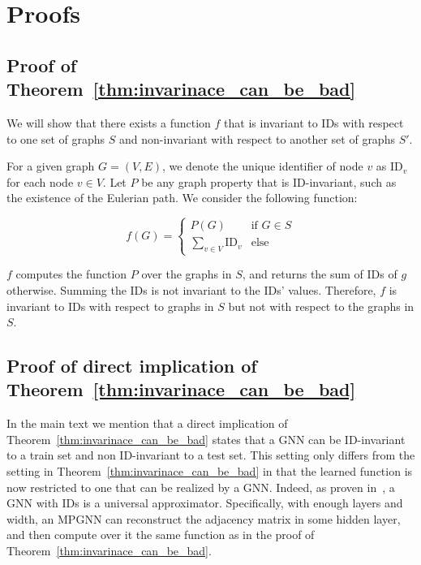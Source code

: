 \onecolumn

\section{Proofs}
\subsection{Proof of Theorem~\ref{thm:invarinace_can_be_bad}}
We will show that there exists a function $f$  that is invariant to IDs with respect to one set of graphs \( S \) and non-invariant with respect to another set of graphs \( S' \). 

For a given graph $G=(V,E)$, we denote the unique identifier of node $v$ as \( \text{ID}_v \) for each node \( v \in V \). Let $P$ be any graph property that is ID-invariant, such as the existence of the Eulerian path. We consider the following function:

   \[
   f(G) = 
   \begin{cases} 
   P(G) & \text{if } G \in S \\ 
   \sum_{v \in V} \text{ID}_v & \text{else }
   \end{cases}
   \]


$f$ computes the function $P$ over the graphs in $S$, and returns the sum of IDs of $g$ otherwise. 
Summing the IDs is not invariant to the IDs' values. Therefore, $f$ is invariant to IDs with respect to graphs in $S$ but not with respect to the graphs in $S$.


\subsection{Proof of direct implication of Theorem~\ref{thm:invarinace_can_be_bad}}
In the main text we mention that a direct implication of Theorem~\ref{thm:invarinace_can_be_bad} states that a GNN can be ID-invariant to a train set and non ID-invariant to a test set. 
This setting only differs from the setting in Theorem~\ref{thm:invarinace_can_be_bad} in that the learned function is now restricted to one that can be realized by a GNN.
Indeed, as proven in~\citet{abboud2021surprisingpowergraphneural}, a GNN with IDs is a universal approximator. Specifically, with enough layers and width, an MPGNN can reconstruct the adjacency matrix in some hidden layer, and then compute over it the same function as in the proof of Theorem~\ref{thm:invarinace_can_be_bad}.

\newcommand{\GNNRit}[0]{\textit{GNN-R}}
\newcommand{\Git}[0]{\textit{GNN'}}
